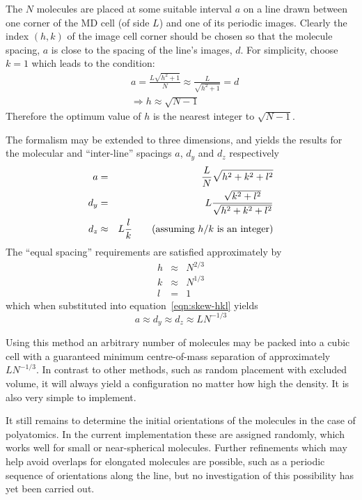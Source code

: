 \documentclass[a4paper,twoside]{report}
\begin{document}
The $N$ molecules are placed at some suitable interval $a$ on a line
drawn between one corner of the MD cell (of side $L$) and one of its
periodic images.  Clearly the index $(h,k)$ of the image cell corner
should be chosen so that the molecule spacing, $a$ is close to the
spacing of the line's images, $d$. For simplicity, choose $k=1$ which
leads to the condition:
\begin{eqnarray}
\nonumber
 &a = \frac{L \sqrt{h^2+1}}{N} \approx \frac{L}{\sqrt{h^2+1}} = d \\
& \Rightarrow h \approx \sqrt{N-1}
\end{eqnarray}
Therefore the optimum value of $h$ is the nearest integer to
$\sqrt{N-1}$.  

The formalism may be extended to three dimensions, and yields the
results for the molecular and ``inter-line'' spacings $a$, $d_y$ and
$d_z$ respectively
\begin{eqnarray}
\label{eqn:skew-hkl}
\nonumber
a & = & \frac{L}{N}\sqrt{h^2+k^2+l^2}\\
d_y  & = & L \frac{\sqrt{k^2+l^2}}{\sqrt{h^2+k^2+l^2}} \\
d_z & \approx & L\frac{l}{k} \qquad\textnormal{(assuming $h/k$ is an integer)}
\nonumber
\end{eqnarray}
The ``equal spacing'' requirements are satisfied approximately by
\begin{eqnarray}
  \nonumber
  h & \approx & N^{2/3} \\
  k & \approx & N^{1/3} \\
  \nonumber
  l & = & 1
\end{eqnarray}
which when substituted into equation~\ref{eqn:skew-hkl} yields
\begin{equation}
  a \approx d_y \approx d_z \approx LN^{-1/3}
\end{equation}

Using this method an arbitrary number of molecules may be packed into
a cubic cell with a guaranteed minimum centre-of-mass separation of
approximately $LN^{-1/3}$.  In contrast to other methods, such as
random placement with excluded volume, it will always yield a
configuration no matter how high the density.  It is also very simple
to implement.

It still remains to determine the initial orientations of the
molecules in the case of polyatomics.  In the current implementation
these are assigned randomly, which works well for small or
near-spherical molecules.  Further refinements which may help avoid
overlaps for elongated molecules are possible, such as a periodic
sequence of orientations along the line, but no investigation of this
possibility has yet been carried out.
\end{document}
